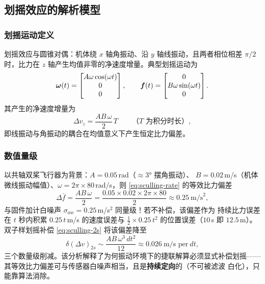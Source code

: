 \subsection{划摇效应的解析模型}

\subsubsection{划摇运动定义}

划摇效应与圆锥对偶：机体绕 $x$ 轴角振动、沿 $y$ 轴线振动，且两者相位相差
$\pi/2$ 时，比力在 $z$ 轴产生均值非零的净速度增量。典型划摇运动为
\begin{equation}
  \boldsymbol{\omega}(t) = \begin{bmatrix} A\omega\cos(\omega t) \\ 0 \\ 0 \end{bmatrix},
  \qquad
  \boldsymbol{f}(t) = \begin{bmatrix} 0 \\ B\omega\sin(\omega t) \\ 0 \end{bmatrix}.
  \label{eq:sculling-motion}
\end{equation}
其产生的净速度增量为
\begin{equation}
  \Delta v_z = \frac{AB\,\omega}{2}\,T
  \qquad\text{（$T$ 为积分时长）},
  \label{eq:sculling-rate}
\end{equation}
即线振动与角振动的耦合在均值意义下产生恒定比力偏差。

\subsubsection{数值量级}

以共轴双桨飞行器为背景：$A = 0.05$\,rad（$\approx3°$ 摆角振动）、
$B = 0.02$\,m/s（机体微线振动幅值）、$\omega = 2\pi\times80$\,rad/s，则
\cref{eq:sculling-rate} 的等效比力偏差
\begin{equation}
  \Delta \bar{f} = \frac{AB\,\omega}{2} = \frac{0.05\times0.02\times
    2\pi\times80}{2} \approx 0.25\ \text{m/s}^2,
  \label{eq:sculling-num}
\end{equation}
与固件加计白噪声 $\sigma_{aw} = 0.25$\,m/s$^2$ 同量级！若不补偿，该偏差作为
持续比力误差在 $t$ 秒内积累 $0.25\,t$\,m/s 的速度误差与 $\frac12\times
0.25\,t^2$ 的位置误差（$10$\,s 即 $12.5$\,m）。双子样划摇补偿
\cref{eq:sculling-2s} 将该偏差降至
\begin{equation}
  \delta(\Delta v)_{2s} \sim \frac{AB\,\omega^3\,dt^2}{12}
  \approx 0.026\ \text{m/s per}\ dt,
  \label{eq:sculling-2s-error}
\end{equation}
三个数量级削减。该分析解释了为何振动环境下的捷联解算必须显式补偿划摇——
其等效比力偏差可与传感器白噪声相当，且是\textbf{持续定向}的（不可被滤波
白化），只能靠算法消除。

